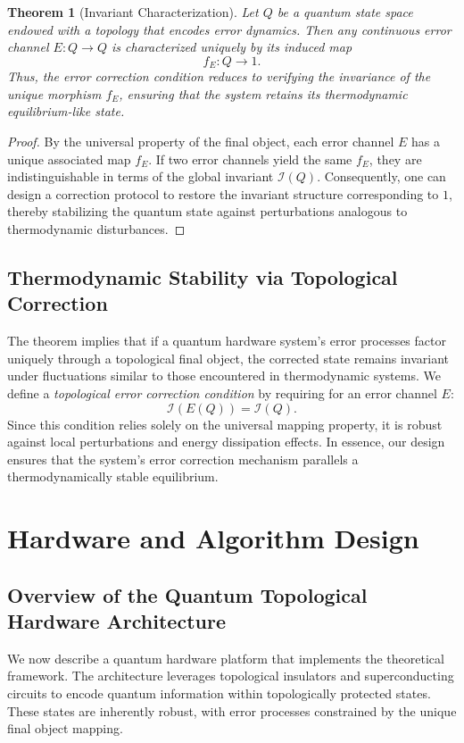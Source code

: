 \documentclass[11pt]{article}
\newtheorem{theorem}{Theorem}[section]
\begin{document}
\begin{theorem}[Invariant Characterization]
Let \(Q\) be a quantum state space endowed with a topology that encodes error dynamics. Then any continuous error channel \(E: Q \to Q\) is characterized uniquely by its induced map
\[
f_E: Q \to 1.
\]
Thus, the error correction condition reduces to verifying the invariance of the unique morphism \(f_E\), ensuring that the system retains its thermodynamic equilibrium-like state.
\end{theorem}

\begin{proof}
By the universal property of the final object, each error channel \(E\) has a unique associated map \(f_E\). If two error channels yield the same \(f_E\), they are indistinguishable in terms of the global invariant \(\mathcal{I}(Q)\). Consequently, one can design a correction protocol to restore the invariant structure corresponding to \(1\), thereby stabilizing the quantum state against perturbations analogous to thermodynamic disturbances.
\end{proof}

\subsection{Thermodynamic Stability via Topological Correction}
The theorem implies that if a quantum hardware system's error processes factor uniquely through a topological final object, the corrected state remains invariant under fluctuations similar to those encountered in thermodynamic systems. We define a \emph{topological error correction condition} by requiring for an error channel \(E\):
\[
\mathcal{I}(E(Q)) = \mathcal{I}(Q).
\]
Since this condition relies solely on the universal mapping property, it is robust against local perturbations and energy dissipation effects. In essence, our design ensures that the system's error correction mechanism parallels a thermodynamically stable equilibrium.

\section{Hardware and Algorithm Design}
\label{sec:hardware}
\subsection{Overview of the Quantum Topological Hardware Architecture}
We now describe a quantum hardware platform that implements the theoretical framework. The architecture leverages topological insulators and superconducting circuits to encode quantum information within topologically protected states. These states are inherently robust, with error processes constrained by the unique final object mapping.
\end{document}
